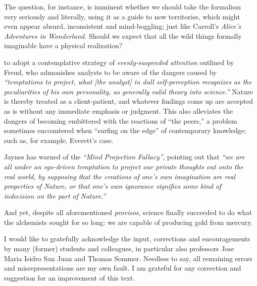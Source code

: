 The question, for instance, is imminent whether we should take the formalism very seriously and literally,
using it as a guide to new territories, which might even appear absurd, inconsistent and mind-boggling;
just like Carroll's {\em Alice's Adventures in Wonderland.}
Should we expect that all the wild things formally imaginable have a physical realization?


 to
adopt a contemplative strategy of {\em evenly-suspended attention}
outlined by  Freud\cite[-20mm]{Freud-1912}, who admonishes analysts to be aware of the dangers
caused by {\em ``temptations to project,
what  [the analyst]  in dull self-perception recognizes as the peculiarities of his own personality,
as generally valid theory into science.''}
Nature is thereby treated as a  client-patient,  and whatever findings come up are accepted  as is  without any
immediate emphasis or judgment.
This also alleviates the dangers of becoming embittered with the reactions of ``the peers,''
a problem sometimes encountered when ``surfing on the edge'' of contemporary knowledge; such as, for
example, Everett's case\cite[-20mm]{everett-collw}.

\newpage

Jaynes has warned of the {\em ``Mind Projection Fallacy''}\cite{jaynes-89,jaynes-90}, pointing out that
{\em ``we are all under an ego-driven temptation to project our private
thoughts out onto the real world, by supposing that the creations of one's own imagination are real
properties of Nature, or that one's own ignorance signifies some kind of indecision on the part of
Nature.''}

And yet, despite all aforementioned {\it provisos}, science finally succeeded to do what the alchemists sought for so long:
we are capable of producing gold from mercury\cite{PhysRev.60.473}.

I would like to gratefully acknowledge the input, corrections and encouragements by many (former) students and colleagues,
in particular also professors Jose Maria Isidro San Juan and Thomas Sommer. Needless to say, all remaining errors and misrepresentations
are my own fault. I am grateful for any correction and suggestion for an improvement of this text.

\begin{center}
{\color{lightgray}   \Huge
\aldine
}
\end{center}
